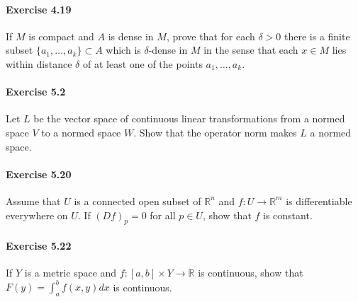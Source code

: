 \documentclass{article}
\begin{document}
\paragraph{Exercise 4.19} If $M$ is compact and $A$ is dense in $M$, prove that for each $\delta > 0$ there is a finite subset $\{a_1, \ldots , a_k\} \subset A$ which is $\delta$-dense in $M$ in the sense that each $x \in M$ lies within distance $\delta$ of at least one of the points $a_1,\ldots, a_k$.


\paragraph{Exercise 5.2} Let $L$ be the vector space of continuous linear transformations from a normed space $V$ to a normed space $W$. Show that the operator norm makes $L$ a normed space.


\paragraph{Exercise 5.20} Assume that $U$ is a connected open subset of $\mathbb{R}^n$ and $f \colon U \rightarrow \mathbb{R}^m$ is differentiable everywhere on $U$. If $(Df)_p = 0$ for all $p \in U$, show that $f$ is constant.


\paragraph{Exercise 5.22} If $Y$ is a metric space and $f \colon [a, b] \times Y \rightarrow \mathbb{R}$ is continuous, show that $F(y) = \int^b_a f(x,y) dx$ is continuous.
\end{document}
